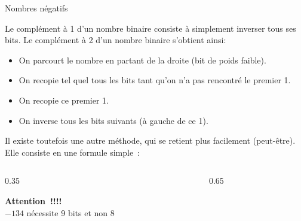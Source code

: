 \begin{frame}{Nombres négatifs}

  \bigskip
  Le complément à 1 d'un nombre binaire consiste à simplement inverser tous
  ses bits.
  \medskip
  Le complément à 2 d'un nombre binaire s'obtient ainsi:
  \begin{itemize}
    \item On parcourt le nombre en partant de la droite (bit de poids faible).
    \item On recopie tel quel tous les bits tant qu'on n'a pas rencontré le premier 1.
    \item On recopie ce premier 1.
    \item On inverse tous les bits suivants (à gauche de ce 1).
  \end{itemize}
  Il existe toutefois une autre méthode, qui se retient plus facilement
  (peut-être). Elle consiste en une formule simple~:

  \bigskip
  \begin{columns}
    \begin{column}{0.35\textwidth}
      \colorbox{blue!20}{\parbox{0.9\textwidth}{\small\textbf{Attention~!!!!}\\
      $-134$ nécessite 9 bits et non 8}}
    \end{column}
    \begin{column}{0.65\textwidth}
    \end{column}
  \end{columns}
\end{frame}

